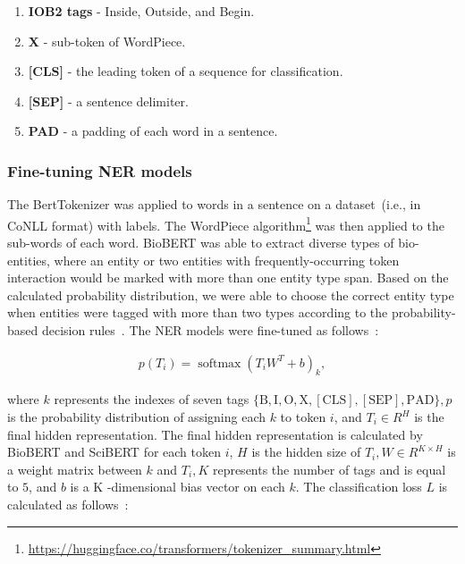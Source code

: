 \begin{enumerate}[noitemsep]
    \item \textbf{IOB2 tags} - Inside, Outside, and Begin. 
    \item \textbf{X} - sub-token of WordPiece.  
    \item \textbf{[CLS]} - the leading token of a sequence for classification. 
    \item \textbf{[SEP]} - a sentence delimiter.  
    \item \textbf{PAD} - a padding of each word in a sentence. 
\end{enumerate}

\subsubsection{Fine-tuning NER models}
The BertTokenizer was applied to words in a sentence on a dataset~(i.e., in CoNLL format) with labels. The WordPiece algorithm\footnote{\url{https://huggingface.co/transformers/tokenizer_summary.html}} was then applied to the sub-words of each word. BioBERT was able to extract diverse types of bio-entities, where an entity or two entities with frequently-occurring token interaction would be marked with more than one entity type span. Based on the calculated probability distribution, we were able to choose the correct entity type when entities were tagged with more than two types according to the probability-based decision rules~\cite{kim2019neural}. The NER models were fine-tuned as follows~\cite{kim2019neural}:

\begin{align}
    p\left(T_{i}\right)=\operatorname{softmax}\left(T_{i} W^{T}+b\right)_{k},
\end{align}

\hspace*{3.5mm} where $k$ represents the indexes of seven tags $\{\mathrm{B}, \mathrm{I}, \mathrm{O}, \mathrm{X},[\mathrm{CLS}],[\mathrm{SEP}], \mathrm{PAD}\}, p$ is the probability distribution of assigning each $k$ to token $i$, and $T_{i} \in R^{H}$ is the final hidden representation. The final hidden representation is calculated by BioBERT and SciBERT for each token $i$, $H$ is the hidden size of $T_{i}, W \in R^{K \times H}$ is a weight matrix between $k$ and $T_{i}, K$ represents the number of tags and is equal to $5$, and $b$ is a $\mathrm{K}$ -dimensional bias vector on each $k$. The classification loss $L$ is calculated as follows~\cite{kim2019neural}:

